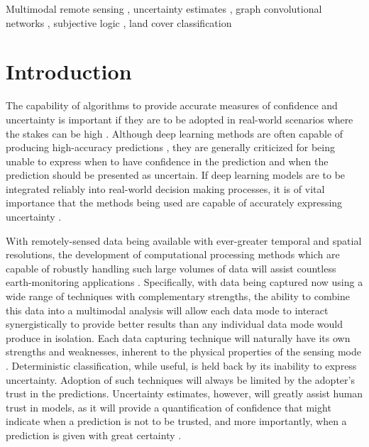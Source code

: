 \documentclass[
twocolumn,
]{ceurart}
\begin{document}
\begin{keywords}
  Multimodal remote sensing \sep
  uncertainty estimates \sep
  graph convolutional networks \sep
  subjective logic \sep
  land cover classification
\end{keywords}

\maketitle

\section{Introduction}
The capability of algorithms to provide accurate measures of confidence and uncertainty is important if they are to be adopted in real-world scenarios where the stakes can be high \cite{Goodman2017}.
Although deep learning methods are often capable of producing high-accuracy predictions \cite{LeCun2015, LiangpeiZhang2016}, they are generally criticized for being unable to express when to have confidence in the prediction and when the prediction should be presented as uncertain.
If deep learning models are to be integrated reliably into real-world decision making processes, it is of vital importance that the methods being used are capable of accurately expressing uncertainty \cite{Lee2004}.

With remotely-sensed data being available with ever-greater temporal and spatial resolutions, the development of computational processing methods which are capable of robustly handling such large volumes of data will assist countless earth-monitoring applications \cite{Chi2016}.
Specifically, with data being captured now using a wide range of techniques with complementary strengths, the ability to combine this data into a multimodal analysis will allow each data mode to interact synergistically to provide better results than any individual data mode would produce in isolation.
Each data capturing technique will naturally have its own strengths and weaknesses, inherent to the physical properties of the sensing mode \cite{Chlaily2021, Marinoni2021}.
Deterministic classification, while useful, is held back by its inability to express uncertainty.
Adoption of such techniques will always be limited by the adopter's trust in the predictions.
Uncertainty estimates, however, will greatly assist human trust in models, as it will provide a quantification of confidence that might indicate when a prediction is not to be trusted, and more importantly, when a prediction is given with great certainty \cite{Chakraborty2017}.
\end{document}
